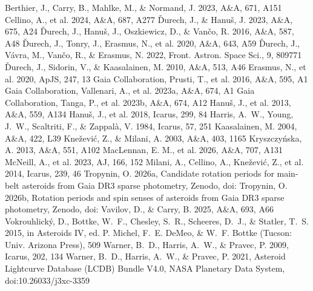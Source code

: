 \begin{thebibliography}{}
 Berthier, J., Carry, B., Mahlke, M., \& Normand, J. 2023, A\&A, 671, A151
 Cellino, A., et al. 2024, A\&A, 687, A277
 \v{D}urech, J., \& Hanu\v{s}, J. 2023, A\&A, 675, A24
 \v{D}urech, J., Hanu\v{s}, J., Oszkiewicz, D., \& Van\v{c}o, R. 2016, A\&A, 587, A48
 \v{D}urech, J., Tonry, J., Erasmus, N., et al. 2020, A\&A, 643, A59
 \v{D}urech, J., V\'avra, M., Van\v{c}o, R., \& Erasmus, N. 2022, Front. Astron. Space Sci., 9, 809771
 \v{D}urech, J., Sidorin, V., \& Kaasalainen, M. 2010, A\&A, 513, A46
 Erasmus, N., et al. 2020, ApJS, 247, 13
 Gaia Collaboration, Prusti, T., et al. 2016, A\&A, 595, A1
 Gaia Collaboration, Vallenari, A., et al. 2023a, A\&A, 674, A1
 Gaia Collaboration, Tanga, P., et al. 2023b, A\&A, 674, A12
 Hanu\v{s}, J., et al. 2013, A\&A, 559, A134
 Hanu\v{s}, J., et al. 2018, Icarus, 299, 84
 Harris, A.~W., Young, J.~W., Scaltriti, F., \& Zappal\`{a}, V. 1984, Icarus, 57, 251
 Kaasalainen, M. 2004, A\&A, 422, L39
 Kne\v{z}evi\'{c}, Z., \& Milani, A. 2003, A\&A, 403, 1165
 Kryszczy\'{n}ska, A. 2013, A\&A, 551, A102
 MacLennan, E. M., et al. 2026, A\&A, 707, A131
 McNeill, A., et al. 2023, AJ, 166, 152
 Milani, A., Cellino, A., Kne\v{z}evi\'{c}, Z., et al. 2014, Icarus, 239, 46
 Tropynin, O. 2026a, Candidate rotation periods for main-belt asteroids from Gaia DR3 sparse photometry, Zenodo, doi:
 Tropynin, O. 2026b, Rotation periods and spin senses of asteroids from Gaia DR3 sparse photometry, Zenodo, doi:
 Vavilov, D., \& Carry, B. 2025, A\&A, 693, A66
 Vokrouhlick\'{y}, D., Bottke, W.~F., Chesley, S.~R., Scheeres, D.~J., \& Statler, T.~S. 2015, in Asteroids IV, ed. P. Michel, F.~E. DeMeo, \& W.~F. Bottke (Tucson: Univ. Arizona Press), 509
 Warner, B.~D., Harris, A.~W., \& Pravec, P. 2009, Icarus, 202, 134
 Warner, B.~D., Harris, A.~W., \& Pravec, P. 2021, Asteroid Lightcurve Database (LCDB) Bundle V4.0, NASA Planetary Data System, doi:10.26033/j3xc-3359
\end{thebibliography}
